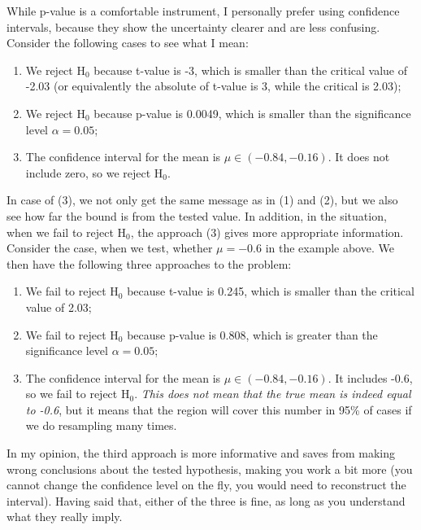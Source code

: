 \documentclass[
]{book}
\providecommand{\tightlist}{%
  \setlength{\itemsep}{0pt}\setlength{\parskip}{0pt}}
\theoremstyle{definition}
\theoremstyle{definition}
\theoremstyle{definition}
\theoremstyle{definition}
\theoremstyle{remark}
\begin{document}
While p-value is a comfortable instrument, I personally prefer using confidence intervals, because they show the uncertainty clearer and are less confusing. Consider the following cases to see what I mean:

\begin{enumerate}
\def\labelenumi{\arabic{enumi}.}
\tightlist
\item
  We reject \(\mathrm{H}_0\) because t-value is -3, which is smaller than the critical value of -2.03 (or equivalently the absolute of t-value is 3, while the critical is 2.03);
\item
  We reject \(\mathrm{H}_0\) because p-value is 0.0049, which is smaller than the significance level \(\alpha=0.05\);
\item
  The confidence interval for the mean is \(\mu \in (-0.84, -0.16)\). It does not include zero, so we reject \(\mathrm{H}_0\).
\end{enumerate}

In case of (3), we not only get the same message as in (1) and (2), but we also see how far the bound is from the tested value. In addition, in the situation, when we fail to reject \(\mathrm{H}_0\), the approach (3) gives more appropriate information. Consider the case, when we test, whether \(\mu=-0.6\) in the example above. We then have the following three approaches to the problem:

\begin{enumerate}
\def\labelenumi{\arabic{enumi}.}
\tightlist
\item
  We fail to reject \(\mathrm{H}_0\) because t-value is 0.245, which is smaller than the critical value of 2.03;
\item
  We fail to reject \(\mathrm{H}_0\) because p-value is 0.808, which is greater than the significance level \(\alpha=0.05\);
\item
  The confidence interval for the mean is \(\mu \in (-0.84, -0.16)\). It includes -0.6, so we fail to reject \(\mathrm{H}_0\). \emph{This does not mean that the true mean is indeed equal to -0.6}, but it means that the region will cover this number in 95\% of cases if we do resampling many times.
\end{enumerate}

In my opinion, the third approach is more informative and saves from making wrong conclusions about the tested hypothesis, making you work a bit more (you cannot change the confidence level on the fly, you would need to reconstruct the interval). Having said that, either of the three is fine, as long as you understand what they really imply.
\end{document}
